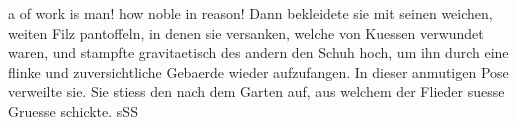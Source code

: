 \documentclass{scrbook}
\begin{document}
\beginnumbering      
\pstart
{} a  of work is man! how noble in reason! 
\pend
\pstart
{}Dann bekleidete sie mit seinen weichen, weiten Filz
pantoffeln, in denen sie versanken, 
welche von Kuessen verwundet waren, und stampfte gravitaetisch
 des andern den Schuh hoch, um ihn durch eine flinke und zuversichtliche Gebaerde wieder aufzufangen. In dieser anmutigen Pose verweilte sie. Sie stiess den  nach dem Garten auf, aus welchem der Flieder suesse Gruesse schickte.
\pend[]
\pstart
sSS
\pend



\endnumbering
\end{document}
